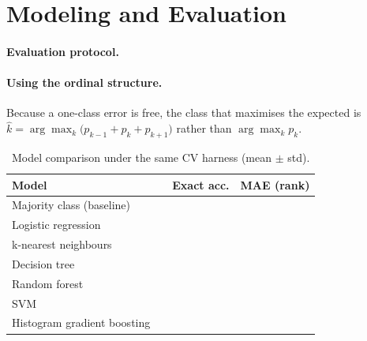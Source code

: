 \section{Modeling and Evaluation}
\label{sec:modeling}

\paragraph{Evaluation protocol.}

\paragraph{Using the ordinal structure.}
Because a one-class error is free, the class that maximises the
expected \onenotch{} is
$\hat k = \arg\max_k \big(p_{k-1} + p_k + p_{k+1}\big)$
rather than $\arg\max_k p_k$.

\begin{table}[h]
  \centering\small
  \caption{Model comparison under the same CV harness (mean $\pm$ std).}
  \label{tab:models}
  \begin{tabular}{lccc}
    \toprule
    Model & \onenotch{} & Exact acc. & MAE (rank) \\
    \midrule
    Majority class (baseline)      & \todo{} & \todo{} & \todo{} \\
    Logistic regression            & \todo{} & \todo{} & \todo{} \\
    k-nearest neighbours           & \todo{} & \todo{} & \todo{} \\
    Decision tree                  & \todo{} & \todo{} & \todo{} \\
    Random forest                  & \todo{} & \todo{} & \todo{} \\
    SVM                            & \todo{} & \todo{} & \todo{} \\
    Histogram gradient boosting    & \todo{} & \todo{} & \todo{} \\
    \bottomrule
  \end{tabular}
\end{table}

